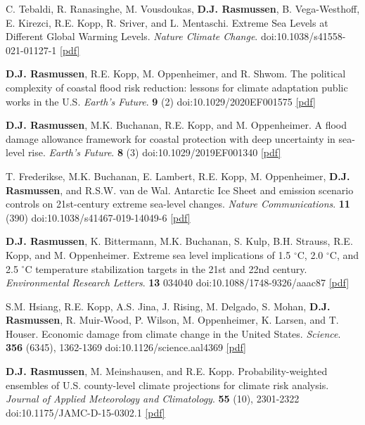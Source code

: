 \documentclass[10.5pt]{article}
\newcommand{\yr}[1]{{\sffamily\bfseries #1}}
\begin{document}
\begin{entries}
\item[\yr{2021}] C. Tebaldi, R. Ranasinghe, M. Vousdoukas, \textbf{D.J. Rasmussen}, B. Vega-Westhoff, E. Kirezci, R.E. Kopp, R. Sriver, and L. Mentaschi. Extreme Sea Levels at Different Global Warming Levels. \emph{Nature Climate Change}. doi:10.1038/s41558-021-01127-1 \href{https://www.nature.com/articles/s41558-021-01127-1}{[pdf]}
\item[\yr{2021}] \textbf{D.J. Rasmussen}, R.E. Kopp, M. Oppenheimer, and R. Shwom. The political complexity of coastal flood risk reduction: lessons for climate adaptation public works in the U.S. \emph{Earth's Future}. \textbf{9} (2) doi:10.1029/2020EF001575 \href{https://agupubs.onlinelibrary.wiley.com/doi/abs/10.1029/2020EF001575}{[pdf]}
\item[\yr{2020}] \textbf{D.J. Rasmussen}, M.K. Buchanan, R.E. Kopp, and M. Oppenheimer. A flood damage allowance framework for coastal protection with deep uncertainty in sea-level rise. \emph{Earth's Future}. \textbf{8} (3) doi:10.1029/2019EF001340 \href{https://agupubs.onlinelibrary.wiley.com/doi/epdf/10.1029/2019EF001340}{[pdf]}
\item[\yr{2020}] T. Frederikse, M.K. Buchanan, E. Lambert, R.E. Kopp, M. Oppenheimer, \textbf{D.J. Rasmussen}, and R.S.W. van de Wal. Antarctic Ice Sheet and emission scenario controls on 21st-century extreme sea-level changes. \emph{Nature Communications}. \textbf{11} (390) doi:10.1038/s41467-019-14049-6 \href{https://www.nature.com/articles/s41467-019-14049-6.pdf}{[pdf]}
\item[\yr{2018}] \textbf{D.J. Rasmussen}, K. Bittermann, M.K. Buchanan, S. Kulp, B.H. Strauss, R.E. Kopp, and M. Oppenheimer. Extreme sea level implications of 1.5 $^\circ$C, 2.0 $^\circ$C, and 2.5 $^\circ$C temperature stabilization targets in the 21st and 22nd century. \emph{Environmental Research Letters}. \textbf{13} 034040 doi:10.1088/1748-9326/aaac87 \href{https://iopscience.iop.org/article/10.1088/1748-9326/aaac87/pdf}{[pdf]}
\item[\yr{2017}] S.M. Hsiang, R.E. Kopp, A.S. Jina, J. Rising, M. Delgado, S. Mohan, \textbf{D.J. Rasmussen}, R. Muir-Wood, P. Wilson, M. Oppenheimer, K. Larsen, and T. Houser. Economic damage from climate change in the United States. \emph{Science}. \textbf{356} (6345), 1362-1369 doi:10.1126/science.aal4369 \href{https://www.dropbox.com/s/n8yno7jxrkuut1z/science_paper2017.pdf?dl=0}{[pdf]}
\item[\yr{2016}] \textbf{D.J. Rasmussen}, M. Meinshausen, and R.E. Kopp. Probability-weighted ensembles of U.S. county-level climate projections for climate risk analysis. \emph{Journal of Applied Meteorology and Climatology}. \textbf{55} (10), 2301-2322 doi:10.1175/JAMC-D-15-0302.1 \href{https://journals.ametsoc.org/doi/pdf/10.1175/JAMC-D-15-0302.1}{[pdf]}

\end{entries}
\end{document}
